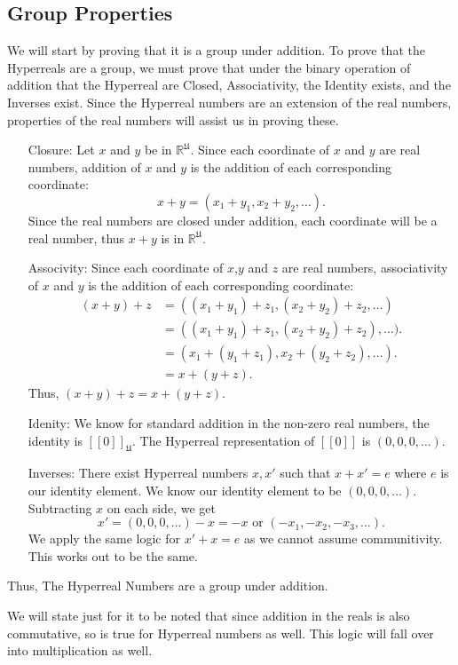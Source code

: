 \documentclass[12pt]{report}
\newcommand{\R}{\mathbb{R}}
\newcommand{\U}{\mathfrak{U}}
\begin{document}
\subsection*{Group Properties}
We will start by proving that it is a group under addition.
To prove that the Hyperreals are a group, we must prove that under the binary operation of addition that the Hyperreal are Closed, Associativity, the Identity exists, and the Inverses exist.
Since the Hyperreal numbers are an extension of the real numbers, properties of the real numbers will assist us in proving these.
\begin{enumerate}
    \item[Closure:]Let $x$ and $y$ be in $\R^\U $.
    Since each coordinate of $x$ and $y$ are real numbers, addition of $x$ and $y $ is the addition of each corresponding coordinate: \[x+y= (x_1 + y_1, x_2+y_2,\ldots).\]
    Since the real numbers are closed under addition, each coordinate will be a real number, thus $x+y$ is in $\R^\U$.
    \item[Associvity:]Since each coordinate of $x$,$y$ and $z$ are real numbers, associativity of $x$ and $y $ is the addition of each corresponding coordinate:
    \begin{align*}
    (x+y)+z &= ((x_1 + y_1)+z_1, (x_2+y_2)+z_2,\ldots)\\
    &= ((x_1 + y_1)+z_1, (x_2+y_2)+z_2),\ldots).\\
    &= (x_1 + (y_1+z_1), x_2+(y_2+z_2),\ldots).\\
    &=x+(y+z).
    \end{align*}
    Thus, $(x+y)+z= x+(y+z)$.
    \item[Idenity:]We know for standard addition in the non-zero real numbers, the identity is $[[0]]_{\U}$.
    The Hyperreal representation of $[[0]]$ is $(0, 0, 0,\ldots)$.
    \item[Inverses:]There exist Hyperreal numbers $x, x'$ such that $x+x' = e $ where $e$ is our identity element.
    We know our identity element to be $(0, 0, 0, \ldots)$.
    Subtracting $x$ on each side, we get \[x' = (0, 0, 0,\ldots) - x = -x \text{ or } (-x_1, -x_2, -x_3,\ldots).\] We apply the same logic for $x' +x = e $ as we cannot assume communitivity.
    This works out to be the same.
\end{enumerate}
Thus, The Hyperreal Numbers are a group under addition.
\newline \par We will state just for it to be noted that since addition in the reals is also commutative, so is true for Hyperreal numbers as well.
This logic will fall over into multiplication as well.
\end{document}
